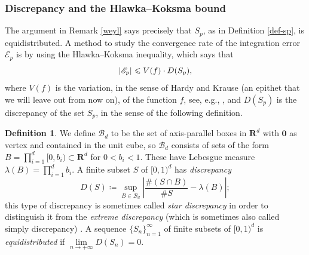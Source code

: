 \documentclass[12pt,reqno]{amsart}
\theoremstyle{definition}
\theoremstyle{plain}
\theoremstyle{definition}
\newtheorem{definition}[theorem]{Definition}
\newcommand{\R}{\mathbf{R}}
\newcommand{\err}{\mathcal{E}}
\renewcommand{\leq}{\leqslant}
\DeclarePairedDelimiter\abs{\lvert}{\rvert}
\begin{document}
\subsubsection*{Discrepancy and the Hlawka--Koksma bound}  The argument in Remark \ref{weyl} says precisely that $S_p$, as in Definition \ref{def-sp}, is equidistributed. 
A method to study the convergence rate of the integration error $\err_p$ is by using the Hlawka--Koksma inequality, which says that 
\begin{equation} 
\label{eq:Hlawka-Koksma}
\abs{\err_p} \leq V(f) \cdot D(S_p),
\end{equation}
where $V(f)$ is the variation, in the sense of Hardy and Krause (an epithet that we will leave out from now on), of the function $f$, see, e.g., \cite[Thm. 3.11]{Leobacher-et-al}, and $D(S_p)$ is the discrepancy of the set $S_p$, in the sense of the following definition. 
\begin{definition} We define $\mathcal B_d$ to be the set of axis-parallel boxes in $\R^d$ with $\mathbf{0}$ as vertex and contained in the unit cube, so $\mathcal B_d$ consists of sets of the form 
 $ B= \prod_{i=1}^d [0,b_i) \subset \R^d$ for $0<b_i<1$. These have Lebesgue measure $\lambda(B) = \prod_{i=1}^d b_i$. 
 A finite subset $S$ of $[0,1)^d$ has \emph{discrepancy}
\begin{equation*}
 D(S)\coloneqq  \sup_{B \in \mathcal B_d} \left| \frac{\# (S \cap B)}{\#S} - \lambda(B)    \right|;
 \end{equation*}
this type of discrepancy is sometimes called \emph{star discrepancy} in order to distinguish it from the \emph{extreme discrepancy} (which is sometimes also called simply discrepancy) \cite[Chapter~2.2]{Leobacher-et-al}. A sequence $\{S_n\}_{n=1}^\infty$ of finite subsets of $[0,1)^d$ is \emph{equidistributed} if $\lim\limits_{n \rightarrow + \infty} D(S_n) = 0$. 
\end{definition} 
\end{document}
